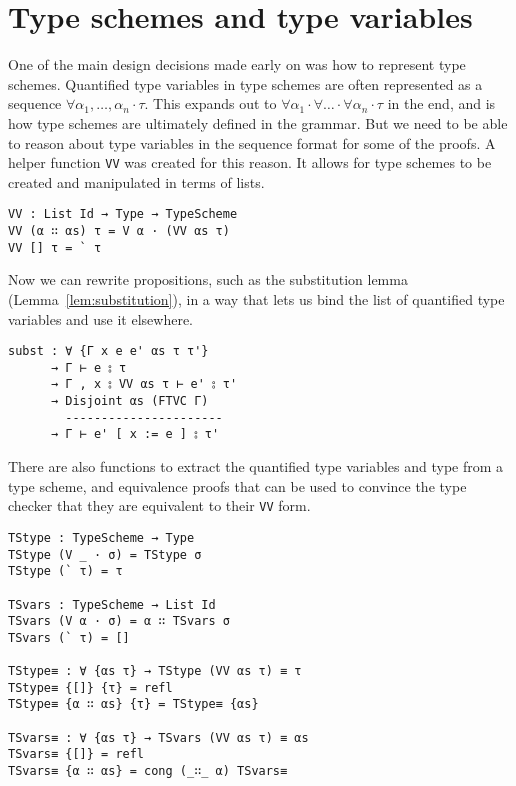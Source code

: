 \section{Type schemes and type variables}
One of the main design decisions made early on was how to represent
type schemes. Quantified type variables in type schemes are often
represented as a sequence
$\forall \alpha_1,\ldots,\alpha_n \cdot \tau$. This expands out to
$\forall \alpha_1 \cdot \forall \ldots \cdot \forall \alpha_n \cdot \tau$ in the end, and is how type schemes are
ultimately defined in the grammar. But we need to be able to reason
about type variables in the sequence format for some of the proofs. A
helper function \texttt{VV} was created for this reason. It allows for
type schemes to be created and manipulated in terms of lists.
\begin{verbatim}
VV : List Id → Type → TypeScheme
VV (α ∷ αs) τ = V α · (VV αs τ)
VV [] τ = ` τ
\end{verbatim}
Now we can rewrite propositions, such as the substitution lemma
(Lemma~\ref{lem:substitution}), in a way that lets us bind the list
of quantified type variables and use it elsewhere.
\begin{verbatim}
subst : ∀ {Γ x e e' αs τ τ'}
      → Γ ⊢ e ⦂ τ
      → Γ , x ⦂ VV αs τ ⊢ e' ⦂ τ'
      → Disjoint αs (FTVC Γ)
        ----------------------
      → Γ ⊢ e' [ x := e ] ⦂ τ'
\end{verbatim}
There are also functions to extract the quantified type variables and
type from a type scheme, and equivalence proofs that can be used to
convince the type checker that they are equivalent to their
\texttt{VV} form.
\begin{verbatim}
TStype : TypeScheme → Type
TStype (V _ · σ) = TStype σ
TStype (` τ) = τ

TSvars : TypeScheme → List Id
TSvars (V α · σ) = α ∷ TSvars σ
TSvars (` τ) = []

TStype≡ : ∀ {αs τ} → TStype (VV αs τ) ≡ τ
TStype≡ {[]} {τ} = refl
TStype≡ {α ∷ αs} {τ} = TStype≡ {αs}

TSvars≡ : ∀ {αs τ} → TSvars (VV αs τ) ≡ αs
TSvars≡ {[]} = refl
TSvars≡ {α ∷ αs} = cong (_∷_ α) TSvars≡
\end{verbatim}

